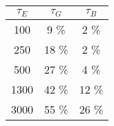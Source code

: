 \begin{tabular}{ccc}
\toprule
$ \tau_E$ & $ \tau_G$ & $ \tau_B$ \\
\midrule
     100 &        9 \% &        2 \% \\
     250 &       18 \% &        2 \% \\
     500 &       27 \% &        4 \% \\
    1300 &       42 \% &       12 \% \\
    3000 &       55 \% &       26 \% \\
\bottomrule
\end{tabular}
